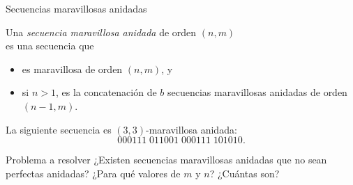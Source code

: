 \documentclass[spanish,xcolor={table}]{beamer}
\begin{document}

\begin{frame}{Secuencias maravillosas anidadas}

\begin{definition}
  Una \emph{secuencia maravillosa anidada} de orden $(n,m)$ \\
  es una secuencia que
  \begin{itemize}
    \item es maravillosa de orden $(n,m)$, y
    \item si $n > 1$, es la concatenación de $b$ secuencias maravillosas anidadas
    de orden $(n-1, m)$.
  \end{itemize}
\end{definition}

\begin{example}
  La siguiente secuencia es $(3,3)$-maravillosa anidada: \vspace{-.5em}
  \[ 000111\;011001\;000111\;101010. \]
\end{example}

\begin{alertblock}{Problema a resolver}
  ¿Existen secuencias maravillosas anidadas que no sean perfectas anidadas? 
  ¿Para qué valores de $m$ y $n$? ¿Cuántas son?
\end{alertblock}

\end{frame}

\end{document}
